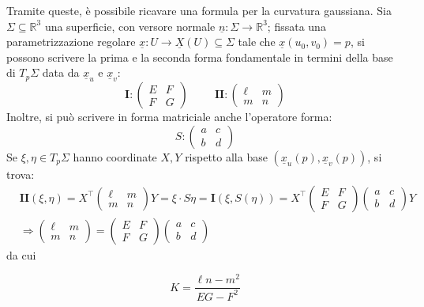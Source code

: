 \documentclass[12pt]{scrartcl}
\theoremstyle{style}
\newenvironment{boxenv}[1][]{
    \begin{eqbox}[#1]
    }{
   \end{eqbox}
}
\numberwithin{equation}{subsection}
\begin{document}
Tramite queste, \`e possibile ricavare una formula per la curvatura gaussiana.
Sia $\Sigma \subseteq \mathbb{R}^3$ una superficie, con versore normale $\underline{n}:\Sigma \to \mathbb{R}^3$; fissata una parametrizzazione regolare $\underline{x}: U \to \underline{X}(U) \subseteq \Sigma$ tale che $\underline{x}(u_0,v_0) = p$, si possono scrivere la prima e la seconda forma fondamentale in termini della base di $T_p \Sigma$ data da $\underline{x}_u$ e $\underline{x}_v$:
\[
	\mathbf{I} : \begin{pmatrix} E & F  \\ F & G\end{pmatrix} \hspace{1cm} \mathbf{II} : \begin{pmatrix} \ell & m \\ m & n  \end{pmatrix} 
\] 
Inoltre, si pu\`o scrivere in forma matriciale anche l'operatore forma:
\[
	S : \begin{pmatrix} a & c \\ b & d \end{pmatrix} 
\] 
Se $\xi , \eta \in T_p \Sigma$ hanno coordinate $X,Y$ rispetto alla base $(\underline{x}_u(p) , \underline{x}_v(p))$, si trova:
\[
	\begin{split}
		&\mathbf{II} (\xi ,\eta) = X^\top \begin{pmatrix} \ell & m \\ m & n  \end{pmatrix} Y = \xi  \cdot S\eta = \mathbf{I} (\xi ,S(\eta)) = X^\top \begin{pmatrix} E & F \\ F & G \end{pmatrix}   \begin{pmatrix} a & c \\ b & d \end{pmatrix} Y \\
		&\Rightarrow \begin{pmatrix} \ell & m \\ m & n \end{pmatrix} = \begin{pmatrix} E & F \\ F & G \end{pmatrix} \begin{pmatrix} a & c \\ b & d \end{pmatrix} 
	\end{split}
\] 
da cui
\begin{boxenv}[]
\begin{equation}
	K = \frac{\ell n - m^2 }{EG - F^2}
\end{equation}
\end{boxenv}
\end{document}
